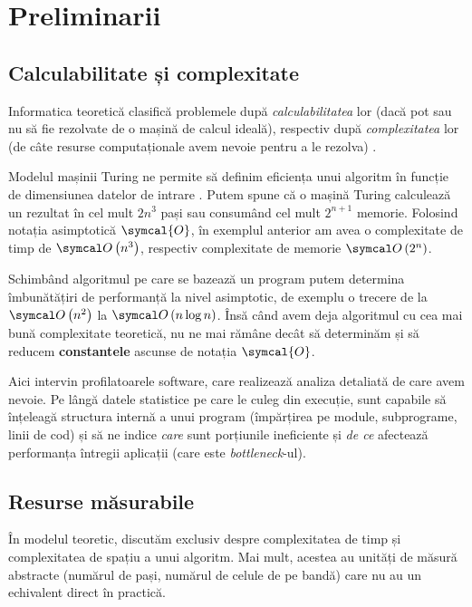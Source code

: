 \chapter{Preliminarii}

\section{Calculabilitate și complexitate}

Informatica teoretică clasifică problemele după \emph{calculabilitatea} lor (dacă pot sau nu să fie rezolvate de o mașină de calcul ideală), respectiv după \emph{complexitatea} lor (de câte resurse computaționale avem nevoie pentru a le rezolva) \cite{computability_complexity_book}.

Modelul mașinii Turing ne permite să definim eficiența unui algoritm în funcție de dimensiunea datelor de intrare  \cite{turing_machine}\cite{computational_complexity_paper}. Putem spune că o mașină Turing calculează un rezultat în cel mult \(2 n^3\) pași sau consumând cel mult \(2^{n + 1}\) memorie. Folosind notația asimptotică \(\symcal{O}\), în exemplul anterior am avea o complexitate de timp de \(\bigO{n^3}\), respectiv complexitate de memorie \(\bigO{2^n}\).

Schimbând algoritmul pe care se bazează un program putem determina îmbunătățiri de performanță la nivel asimptotic, de exemplu o trecere de la \(\bigO{n^2}\) la \(\bigO{n \log n}\). Însă când avem deja algoritmul cu cea mai bună complexitate teoretică, nu ne mai rămâne decât să determinăm și să reducem \textbf{constantele} ascunse de notația \(\symcal{O}\).

Aici intervin profilatoarele software, care realizează analiza detaliată de care avem nevoie. Pe lângă datele statistice pe care le culeg din execuție, sunt capabile să înțeleagă structura internă a unui program (împărțirea pe module, subprograme, linii de cod) și să ne indice \emph{care} sunt porțiunile ineficiente și \emph{de ce} afectează performanța întregii aplicații (care este \textit{bottleneck}-ul).

\section{Resurse măsurabile}

În modelul teoretic, discutăm exclusiv despre complexitatea de timp și complexitatea de spațiu a unui algoritm. Mai mult, acestea au unități de măsură abstracte (numărul de pași, numărul de celule de pe bandă) care nu au un echivalent direct în practică.

